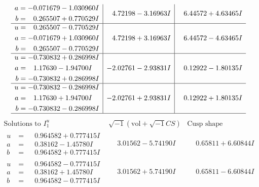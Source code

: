 \documentclass[1p]{elsarticle_modified}
\theoremstyle{definition}
\newcommand{\I}{\sqrt{-1}}
\begin{document}
$$\begin{array}{c|c|c}
\begin{aligned}
a &= -0.071679 - 1.030960 I \\
b &= \phantom{-}0.265507 + 0.770529 I\end{aligned}
 & \phantom{-}4.72198 - 3.16963 I & \phantom{-}6.44572 + 4.63465 I \\ \hline\begin{aligned}
u &= \phantom{-}0.265507 - 0.770529 I \\
a &= -0.071679 + 1.030960 I \\
b &= \phantom{-}0.265507 - 0.770529 I\end{aligned}
 & \phantom{-}4.72198 + 3.16963 I & \phantom{-}6.44572 - 4.63465 I \\ \hline\begin{aligned}
u &= -0.730832 + 0.286998 I \\
a &= \phantom{-}1.17630 - 1.94700 I \\
b &= -0.730832 + 0.286998 I\end{aligned}
 & -2.02761 - 2.93831 I & \phantom{-}0.12922 - 1.80135 I \\ \hline\begin{aligned}
u &= -0.730832 - 0.286998 I \\
a &= \phantom{-}1.17630 + 1.94700 I \\
b &= -0.730832 - 0.286998 I\end{aligned}
 & -2.02761 + 2.93831 I & \phantom{-}0.12922 + 1.80135 I\\
 \hline 
 \end{array}$$\newpage$$\begin{array}{c|c|c}  
\text{Solutions to }I^u_{1}& \I (\text{vol} + \sqrt{-1}CS) & \text{Cusp shape}\\
 \hline 
\begin{aligned}
u &= \phantom{-}0.964582 + 0.777415 I \\
a &= \phantom{-}0.38162 - 1.45780 I \\
b &= \phantom{-}0.964582 + 0.777415 I\end{aligned}
 & \phantom{-}3.01562 - 5.74190 I & \phantom{-}0.65811 + 6.60844 I \\ \hline\begin{aligned}
u &= \phantom{-}0.964582 - 0.777415 I \\
a &= \phantom{-}0.38162 + 1.45780 I \\
b &= \phantom{-}0.964582 - 0.777415 I\end{aligned}
 & \phantom{-}3.01562 + 5.74190 I & \phantom{-}0.65811 - 6.60844 I \\ \hline\begin{aligned}

\end{aligned}
\end{array}$$
\end{document}
